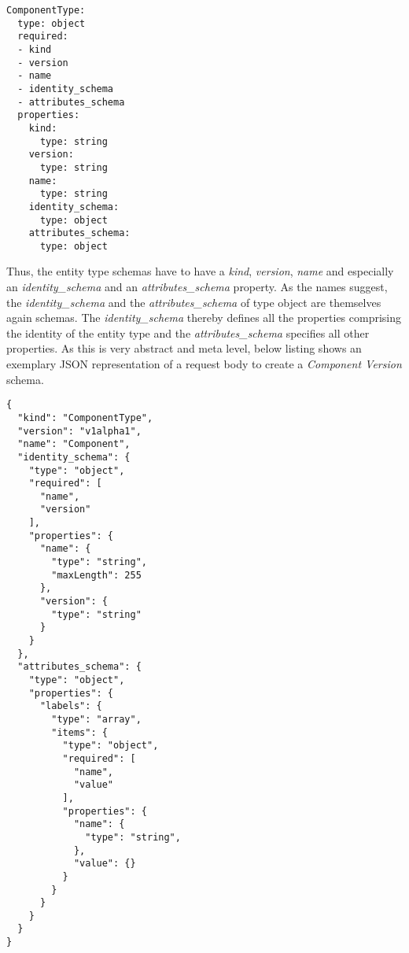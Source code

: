 \begin{lstlisting}[basicstyle=\tiny, caption=Entity Type Schema Schema, captionpos=b, label=lst:EntityTypeSchemaSchema]
ComponentType:
  type: object
  required:
  - kind
  - version
  - name
  - identity_schema
  - attributes_schema
  properties:
    kind: 
      type: string
    version:
      type: string
    name:
      type: string
    identity_schema:
      type: object
    attributes_schema:
      type: object
\end{lstlisting}

Thus, the entity type schemas have to have a \emph{kind}, \emph{version}, \emph{name} and especially an \emph{identity\_schema} and an \emph{attributes\_schema} property. %
As the names suggest, the \emph{identity\_schema} and the \emph{attributes\_schema} of type object are themselves again schemas. The \emph{identity\_schema} thereby defines all the properties comprising the identity of the entity type and the \emph{attributes\_schema} specifies all other properties. As this is very abstract and meta level, below listing shows an exemplary JSON representation of a request body to create a \emph{Component Version} schema. 

\begin{lstlisting}[basicstyle=\tiny, caption=Request Body for Component Version Schema Creation, captionpos=b, label=lst:ComponentVersionSchemaCreation]
{
  "kind": "ComponentType",
  "version": "v1alpha1",
  "name": "Component",
  "identity_schema": {
    "type": "object",
    "required": [
      "name",
      "version"
    ],
    "properties": {
      "name": {
        "type": "string",
        "maxLength": 255
      },
      "version": {
        "type": "string"
      }
    }
  },
  "attributes_schema": {
    "type": "object",
    "properties": {
      "labels": {
        "type": "array",
        "items": {
          "type": "object",
          "required": [
            "name",
            "value"
          ],
          "properties": {
            "name": {
              "type": "string",
            },
            "value": {}
          }
        }  
      }
    }
  }
}
\end{lstlisting}


